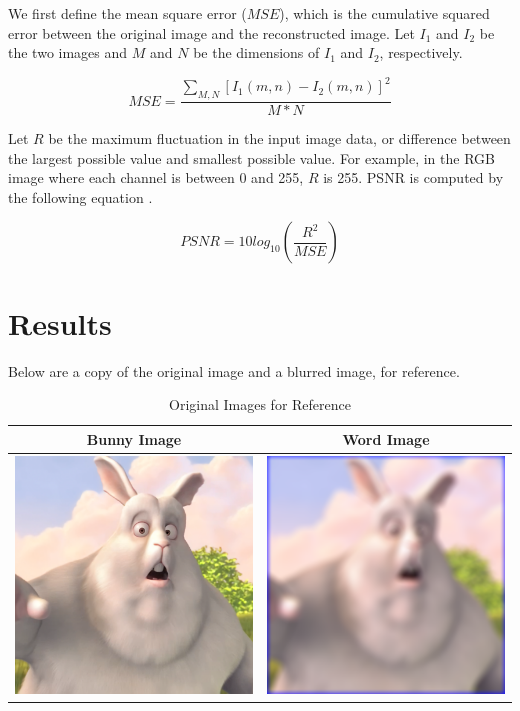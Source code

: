 We first define the mean square error ($MSE$), which is the cumulative squared error between the original image and the reconstructed image. Let $I_1$ and $I_2$ be the two images and $M$ and $N$ be the dimensions of $I_1$ and $I_2$, respectively.

$$MSE = \frac{\sum_{M,N}[I_1(m,n) - I_2(m,n)]^2}{M * N}$$

Let $R$ be the maximum fluctuation in the input image data, or difference between the largest possible value and smallest possible value. For example, in the RGB image where each channel is between 0 and 255, $R$ is 255. PSNR is computed by the following equation \cite{PSNR}.

$$PSNR = 10 log_{10} \left(\frac{R^2}{MSE}\right)$$

\section{Results}

Below are a copy of the original image and a blurred image, for reference.

\begin{table}[!h]
  \centering
    \caption{Original Images for Reference}
    \begin{tabular}{| c | c |}
    \hline Bunny Image & Word Image \\ \hline
      \includegraphics[width=2.5in]{chapters/chapter9/images/reference_image/origin.png} &
      \includegraphics[width=2.5in]{chapters/chapter9/images/reference_image/origin_blur_image.png} \\ \hline
    \end{tabular}
\end{table}

